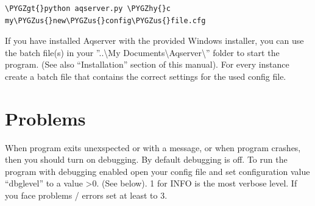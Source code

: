 \documentclass[a4paper,10pt,english]{sphinxmanual}
\def\PYGZus{\char`\_}
\def\PYGZgt{\char`\>}
\def\PYGZhy{\char`\-}
\begin{document}
\begin{Verbatim}[commandchars=\\\{\}]
\PYGZgt{}python aqserver.py \PYGZhy{}c my\PYGZus{}new\PYGZus{}config\PYGZus{}file.cfg
\end{Verbatim}

If you have installed Aqserver with the provided Windows installer, you can use the batch file(s) in your ''..\textbackslash{}My Documents\textbackslash{}Aqserver\textbackslash{}'' folder to start the program. (See also ``Installation'' section of this manual). For every instance create a batch file that contains the correct settings for the used config file.


\chapter{Problems}
\label{problems:problems}\label{problems::doc}
When program exits unexspected or with a message, or when program crashes, then you should turn on debugging. By default debugging is off. To run the program with debugging enabled open your config file and set
configuration value ``dbglevel'' to a value \textgreater{}0. (See below). 1 for INFO is the most verbose level. If you face problems / errors set at least to 3.
\end{document}
